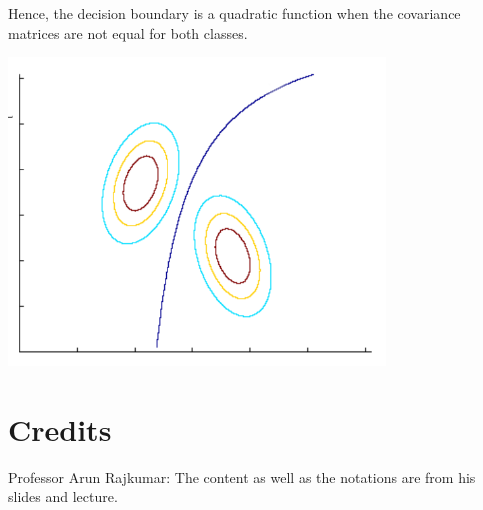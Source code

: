 \documentclass[
]{article}
\begin{document}
\begin{enumerate}
Hence, the decision boundary is a quadratic function when the covariance
matrices are not equal for both classes.

\includegraphics[width=10cm]{./images/non-equal_var.png}

\end{enumerate}

\hypertarget{credits}{%
\section{Credits}\label{credits}}

Professor Arun Rajkumar: The content as well as the notations are from
his slides and lecture.
\end{document}

